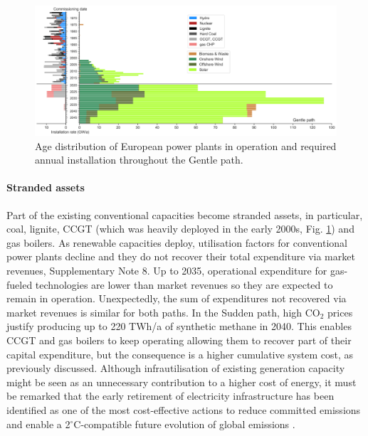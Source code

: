 \documentclass[5p]{elsarticle} %
\begin{document}
\begin{figure}[!h]
\centering
\includegraphics[width=\textwidth]{figures/age_distribution_Base_Gentle.png}
\caption{Age distribution of European power plants in operation \cite{powerplantmatching, IRENA_2019} and required annual installation throughout the Gentle path.} \label{fig_age_distribution} 
\end{figure}

\paragraph{\textbf{Stranded assets}} Part of the existing conventional capacities become stranded assets, in particular, coal, lignite, CCGT (which was heavily deployed in the early 2000s, Fig. \ref{fig_age_distribution}) and gas boilers. As renewable capacities deploy, utilisation factors for conventional power plants decline and they do not recover their total expenditure via market revenues, Supplementary Note 8. Up to 2035, operational expenditure for gas-fueled technologies are lower than market revenues so they are expected to remain in operation. Unexpectedly, the sum of expenditures not recovered via market revenues is similar for both paths. In the Sudden path, high CO$_2$ prices justify producing up to 220 TWh/a of synthetic methane in 2040. This enables CCGT and gas boilers to keep operating allowing them to recover part of their capital expenditure, but the consequence is a higher cumulative system cost, as previously discussed. Although infrautilisation of existing generation capacity might be seen as an unnecessary contribution to a higher cost of energy, it must be remarked that the early retirement of electricity infrastructure has been identified as one of the most cost-effective actions to reduce committed emissions and enable a 2$^{\circ}$C-compatible future evolution of global emissions \cite{Tong_2019}.
\end{document}
